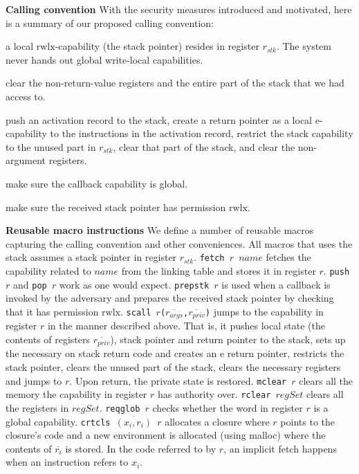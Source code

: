 \documentclass[compsoc,conference,letterpaper,fleqn]{IEEEtran}
\newcommand{\var}[1]{\mathit{#1}}
\newcommand{\stk}{\var{stk}}
\newcommand{\plainperm}[1]{\mathrm{#1}}
\newcommand{\entry}{\plainperm{e}}
\newcommand{\rwlx}{\plainperm{rwlx}}
\begin{document}
\textbf{Calling convention} With the security measures introduced and motivated,
here is a summary of our proposed calling convention:
\begin{description}[font=\normalfont\itshape]
\item[At program start-up] a local $\rwlx$-capability (the stack pointer) resides in register $r_\stk$. The system never hands out global write-local capabilities.
\item[Before returning to the adversary] clear the non-return-value registers and the entire part of the stack that we had access to.
\item[Before invoking the adversary] push an activation record to the stack, create a return pointer as a local $\entry$-capability to the instructions in the activation record, restrict the stack capability to the unused part in $r_\stk$, clear that part of the stack, and clear the non-argument registers.
\item[Before invoking an adversary callback] make sure the callback capability is global.
\item[When called by an adversary] make sure the received stack pointer has permission $\rwlx$.
\end{description}
\textbf{Reusable macro instructions} We define a number of reusable macros
capturing the calling convention and other conveniences. All macros that uses
the stack assumes a stack pointer in register $r_\stk$.
\texttt{\footnotesize{fetch $r$ $\var{name}$}} fetches the capability related to
$\var{name}$ from the linking table and stores it in register $r$.
\texttt{\footnotesize{push $r$}} and \texttt{\footnotesize{pop $r$}} work as one
would expect. \texttt{\footnotesize{prepstk $r$}} is used when a callback is
invoked by the adversary and prepares the received stack pointer by checking
that it has permission $\rwlx$.
\texttt{\footnotesize{scall
    $r$($\overline{r_{\var{args}}}$,$\overline{r_{\var{priv}}}$)}} jumps to the
capability in register $r$ in the manner described above. That is, it pushes
local state (the contents of registers $\overline{r_{\var{priv}}}$), stack
pointer and return pointer to the stack, sets up the necessary on stack return
code and creates an $\entry$ return pointer, restricts the stack pointer, clears
the unused part of the stack, clears the necessary registers and jumps to $r$.
Upon return, the private state is restored. \texttt{\footnotesize{mclear $r$}}
clears all the memory the capability in register $r$ has authority over.
\texttt{\footnotesize{rclear $\var{regSet}$}} clears all the registers in
$\var{regSet}$. \texttt{\footnotesize{reqglob $r$}} checks whether the word in
register $r$ is a global capability. \texttt{\footnotesize{crtcls
    $\overline{(x_i,r_i)}$ $r$}} allocates a closure where $r$ points to the
closure's code and a new environment is allocated (using malloc) where the
contents of $\overline{r_i}$ is stored. In the code referred to by $r$, an
implicit fetch happens when an instruction refers to $x_i$.
\end{document}
